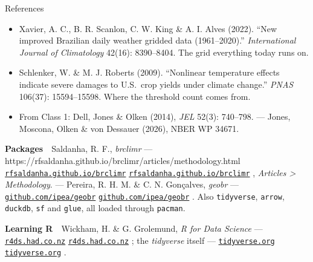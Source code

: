 \documentclass[aspectratio=169,10pt]{beamer}
\newcommand{\code}[1]{\texttt{\small #1}}
\newcommand{\wl}[2][]{%
  \ifx\relax#1\relax
    \href{https://#2}{\code{#2}}%
  \else
    \href{#1}{\code{#2}}%
  \fi}
\newcommand{\dsub}[1]{{\scriptsize\color{climgrey}#1}}
\begin{document}
\begin{frame}{References}
  \footnotesize
  \begin{itemize}
    \setlength{\itemsep}{2pt}
    \item Xavier, A. C., B. R. Scanlon, C. W. King \& A. I. Alves (2022). ``New
          improved Brazilian daily weather gridded data (1961--2020).''
          \emph{International Journal of Climatology} 42(16): 8390--8404.
          \dsub{The grid everything today runs on.}
    \item Schlenker, W. \& M. J. Roberts (2009). ``Nonlinear temperature effects
          indicate severe damages to U.S.\ crop yields under climate change.''
          \emph{PNAS} 106(37): 15594--15598. \dsub{Where the threshold count
          comes from.}
    \item \dsub{From Class 1:} Dell, Jones \& Olken (2014), \emph{JEL} 52(3):
          740--798. --- Jones, Moscona, Olken \& von Dessauer (2026), NBER WP
          34671.
  \end{itemize}
  \vspace{6pt}
  {\footnotesize\textbf{Packages}}\ \ {\footnotesize Saldanha, R. F.,
  \emph{brclimr} ---
  \wl[https://rfsaldanha.github.io/brclimr/articles/methodology.html]%
     {rfsaldanha.github.io/brclimr}, \emph{Articles \textgreater{}
  Methodology}. --- Pereira, R. H. M. \& C. N. Gonçalves, \emph{geobr} ---
  \wl{github.com/ipea/geobr}. Also \code{tidyverse}, \code{arrow},
  \code{duckdb}, \code{sf} and \code{glue}, all loaded through \code{pacman}.}
  \par\vspace{6pt}
  {\footnotesize\textbf{Learning R}}\ \ {\footnotesize Wickham, H. \& G.
  Grolemund, \emph{R for Data Science} --- \wl{r4ds.had.co.nz}; the
  \emph{tidyverse} itself --- \wl{tidyverse.org}.}
\end{frame}
\end{document}
